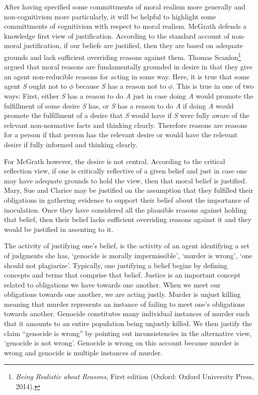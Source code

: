 \documentclass[
  12pt,
]{book}
\theoremstyle{definition}
\theoremstyle{definition}
\theoremstyle{definition}
\theoremstyle{definition}
\theoremstyle{remark}
\begin{document}
After having specified some committments of moral realism more generally and non-cognitivism more particularly, it will be helpful to highlight some committments of cognitivism with respect to moral realism. McGrath defends a knowledge first view of justification. According to the standard account of non-moral justification, if our beliefs are justified, then they are based on adequate grounds and lack sufficient overriding reasons against them. Thomas Scanlon\footnote{\emph{Being Realistic about Reasons}, First edition (Oxford: Oxford University Press, 2014).} argued that moral reasons are fundamentally grounded in desire in that they give an agent non-reducible reasons for acting in some way. Here, it is true that some agent \emph{S} ought not to \(\phi\) because \emph{S} has a reason not to \(\phi\). This is true in one of two ways: First, either \emph{S} has a reason to do \emph{A} just in case doing \emph{A} would promote the fulfillment of some desire \emph{S} has, or \emph{S} has a reason to do \emph{A} if doing \emph{A} would promote the fulfillment of a desire that \emph{S} would have if \emph{S} were fully aware of the relevant non-normative facts and thinking clearly. Therefore reasons are reasons for a person if that person has the relevant desire or would have the relevant desire if fully informed and thinking clearly.

For McGrath however, the desire is not central. According to the critical reflection view, if one is critically reflective of a given belief and just in case one may have adequate grounds to hold the view, then that moral belief is justified. Mary, Sue and Clarice may be justified on the assumption that they fulfilled their obligations in gathering evidence to support their belief about the importance of inoculation. Once they have considered all the plausible reasons against holding that belief, then their belief lacks sufficient overriding reasons against it and they would be justified in assenting to it.

The activity of justifying one's belief, is the activity of an agent identifying a set of judgments she has, `genocide is morally impermissible', `murder is wrong', `one should not plagiarize'. Typically, one justifying a belief begins by defining concepts and terms that comprise that belief. Justice is an important concept related to obligations we have towards one another. When we meet our obligations towards one another, we are acting justly. Murder is unjust killing meaning that murder represents an instance of failing to meet one's obligations towards another. Genocide constitutes many individual instances of murder such that it amounts to an entire population being unjustly killed. We then justify the claim ``genocide is wrong'' by pointing out inconsistencies in the alternative view, `genocide is not wrong'. Genocide is wrong on this account because murder is wrong and genocide is multiple instances of murder.
\end{document}
